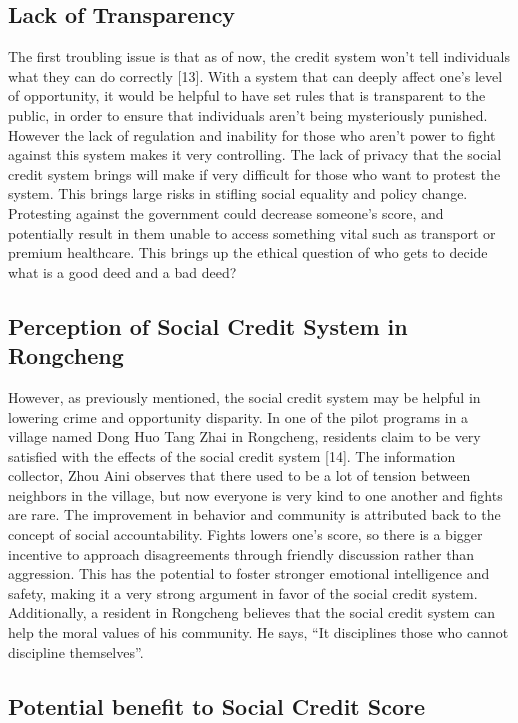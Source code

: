 \documentclass[letterpaper, 10 pt, conference]{ieeeconf}  %
\begin{document}
\subsection{Lack of Transparency}

The first troubling issue is that as of now, the credit system won’t tell individuals what they can do correctly [13]. With a system that can deeply affect one’s level of opportunity, it would be helpful to have set rules that is transparent to the public, in order to ensure that individuals aren’t being mysteriously punished. However the lack of regulation and inability for those who aren’t power to fight against this system makes it very controlling. The lack of privacy that the social credit system brings will make if very difficult for those who want to protest the system. This brings large risks in stifling social equality and policy change. Protesting against the government could decrease someone’s score, and potentially result in them unable to access something vital such as transport or premium healthcare. This brings up the ethical question of who gets to decide what is a good deed and a bad deed?
\subsection{Perception of Social Credit System in Rongcheng}

However, as previously mentioned, the social credit system may be helpful in lowering crime and opportunity disparity. In one of the pilot programs in a village named Dong Huo Tang Zhai  in Rongcheng, residents claim to be very satisfied with the effects of the social credit system [14]. The information collector, Zhou Aini observes that there used to be a lot of tension between neighbors in the village, but now everyone is very kind  to one another and fights are rare. The improvement in behavior and community is attributed back to the concept of social accountability. Fights lowers one’s score, so there is a bigger incentive to approach disagreements through friendly discussion rather than aggression. This has the potential to foster stronger emotional intelligence and safety, making it a very strong argument in favor of the social credit system. Additionally, a resident in Rongcheng believes that the social credit system can help the moral values of his community. He says, “It disciplines those who cannot discipline themselves”.
\subsection{Potential benefit to Social Credit Score}
\end{document}
